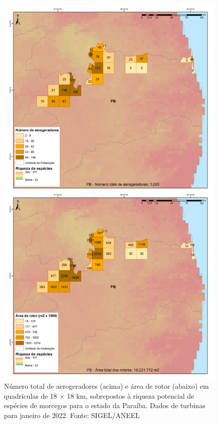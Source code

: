\documentclass[
  oneside]{scrbook}
\begin{document}
\begin{figure}[H]

{\centering \includegraphics[width=0.7\linewidth]{imagens/cap09/Figura_9.9} 

}

\caption{Número total de aerogeradores (acima) e área de rotor (abaixo) em quadrículas de 18 × 18 km, sobrepostos à riqueza potencial de espécies de morcegos para o estado da Paraíba. Dados de turbinas para janeiro de 2022. Fonte: SIGEL/ANEEL}\label{fig:74}
\end{figure}
\end{document}
